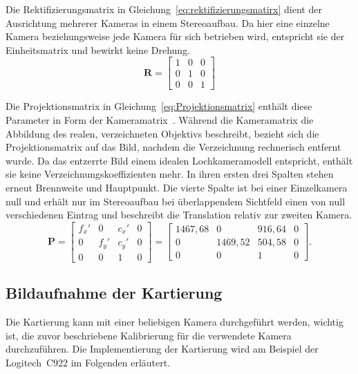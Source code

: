 Die Rektifizierungsmatrix in Gleichung~\ref{eq:rektifizierungsmatirx} dient der Ausrichtung mehrerer Kameras in einem Stereoaufbau.
Da hier eine einzelne Kamera beziehungsweise jede Kamera für sich betrieben wird, entspricht sie der Einheitsmatrix und bewirkt keine Drehung.~\cite{Bradski2008}
\begin{equation}
\label{eq:rektifizierungsmatirx}
    \mathbf{R} =
    \begin{bmatrix}
        1 & 0 & 0 \\
        0 & 1 & 0 \\
        0 & 0 & 1
    \end{bmatrix}
\end{equation}



Die Projektionsmatrix in Gleichung~\ref{eq:Projektionsmatrix} enthält diese Parameter in Form der Kameramatrix~\cite{Bradski2008}.
Während die Kameramatrix die Abbildung des realen, verzeichneten Objektivs beschreibt, bezieht sich die Projektionsmatrix auf das Bild, nachdem die Verzeichnung rechnerisch entfernt wurde.
Da das entzerrte Bild einem idealen Lochkameramodell entspricht, enthält sie keine Verzeichnungskoeffizienten mehr.
In ihren ersten drei Spalten stehen erneut Brennweite und Hauptpunkt.
Die vierte Spalte ist bei einer Einzelkamera null und erhält nur im Stereoaufbau bei überlappendem Sichtfeld einen von null verschiedenen 
Eintrag und beschreibt die Translation relativ zur zweiten Kamera.
\begin{equation}
\label{eq:Projektionsmatrix}
    \mathbf{P} =
    \begin{bmatrix}
        f_x' & 0    & c_x' & 0 \\
        0    & f_y' & c_y' & 0 \\
        0    & 0    & 1    & 0
    \end{bmatrix}
    =
    \begin{bmatrix}
        1467{,}68 & 0         & 916{,}64 & 0 \\
        0         & 1469{,}52 & 504{,}58 & 0 \\
        0         & 0         & 1        & 0
    \end{bmatrix}.
\end{equation}






\subsection{Bildaufnahme der Kartierung}
\label{sec:kartierung_bildaufnahme}
Die Kartierung kann mit einer beliebigen Kamera durchgeführt werden, wichtig ist, die zuvor beschriebene Kalibrierung für die verwendete Kamera durchzuführen.
Die Implementierung der Kartierung wird am Beispiel der Logitech~C922 im Folgenden erläutert.

